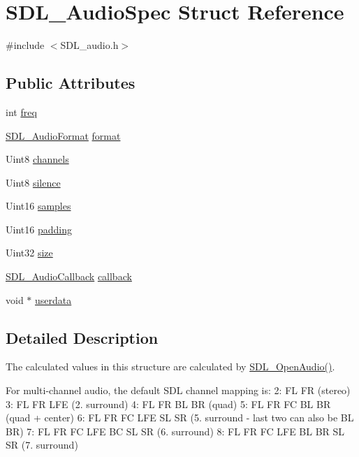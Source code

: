 \hypertarget{structSDL__AudioSpec}{}\section{S\+D\+L\+\_\+\+Audio\+Spec Struct Reference}
\label{structSDL__AudioSpec}


{\ttfamily \#include $<$S\+D\+L\+\_\+audio.\+h$>$}

\subsection*{Public Attributes}
\begin{DoxyCompactItemize}
\item 
int \hyperlink{structSDL__AudioSpec_a8b823ce46fc2e448cf7e6fc141aff6b2}{freq}
\item 
\hyperlink{SDL__audio_8h_a491ed103fd25d920c4e6b7495217ce66}{S\+D\+L\+\_\+\+Audio\+Format} \hyperlink{structSDL__AudioSpec_ae37c634cac5807762f184c8d5d49fc2d}{format}
\item 
Uint8 \hyperlink{structSDL__AudioSpec_a31fe8b3710cf23bbef24be8a1749fe46}{channels}
\item 
Uint8 \hyperlink{structSDL__AudioSpec_addc462c8a806e6c122eccf63482048f6}{silence}
\item 
Uint16 \hyperlink{structSDL__AudioSpec_a2cdf5e885808c10bfa2810b706e69f95}{samples}
\item 
Uint16 \hyperlink{structSDL__AudioSpec_a738371fc13b54cefef4db16994abeeb6}{padding}
\item 
Uint32 \hyperlink{structSDL__AudioSpec_a154cf44743ecec78c36dc6c827dd2fdb}{size}
\item 
\hyperlink{SDL__audio_8h_a379fcc25845e46bfa80cb3619fc2821c}{S\+D\+L\+\_\+\+Audio\+Callback} \hyperlink{structSDL__AudioSpec_a1f8d05139f1679dcf359f49251233eac}{callback}
\item 
void $\ast$ \hyperlink{structSDL__AudioSpec_aeec9481666f5f0982c98d3878f175d9b}{userdata}
\end{DoxyCompactItemize}


\subsection{Detailed Description}
The calculated values in this structure are calculated by \hyperlink{SDL__audio_8h_a2edf30e7747584e28041b4986f89f440}{S\+D\+L\+\_\+\+Open\+Audio()}.

For multi-\/channel audio, the default S\+DL channel mapping is\+: 2\+: FL FR (stereo) 3\+: FL FR L\+FE (2. surround) 4\+: FL FR BL BR (quad) 5\+: FL FR FC BL BR (quad + center) 6\+: FL FR FC L\+FE SL SR (5. surround -\/ last two can also be BL BR) 7\+: FL FR FC L\+FE BC SL SR (6. surround) 8\+: FL FR FC L\+FE BL BR SL SR (7. surround) 

